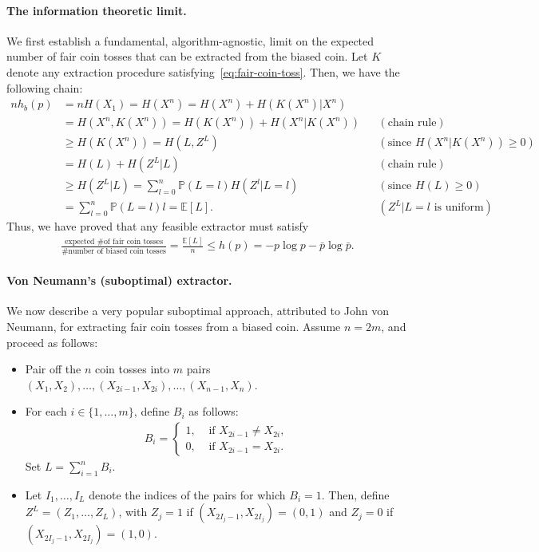 \documentclass[12pt]{article}
\begin{document}
\paragraph{The information theoretic limit.} We first establish a fundamental, algorithm-agnostic, limit on the expected number of fair coin tosses that can be extracted from the biased coin. Let $K$ denote any extraction procedure satisfying~\eqref{eq:fair-coin-toss}. Then, we have the following chain: 
\begin{align}
n h_b(p) &= n H(X_1) = H(X^n) = H(X^n) + H(K(X^n)|X^n)  \\
& = H(X^n, K(X^n)) = H(K(X^n)) + H(X^n|K(X^n)) && (\text{chain rule}) \\
& \geq H(K(X^n)) = H(L, Z^L) && (\text{since } H(X^n|K(X^n)) \geq 0) \\
& =  H(L) + H(Z^L|L) && (\text{chain rule}) \\
& \geq H(Z^L|L) = \sum_{l=0}^{n} \mathbb{P}(L=l) H(Z^l|L=l) && (\text{since } H(L) \geq 0) \\
& = \sum_{l=0}^{n} \mathbb{P}(L=l) l = \mathbb{E}[L]. && (Z^L|L=l \text{ is uniform}) 
\end{align}
Thus, we have proved that any feasible extractor must satisfy 
\begin{align}
\frac{\text{expected \# of fair coin tosses}}{\text{\# number of biased coin tosses}} = \frac{\mathbb{E}[L]}{n}  \leq h(p)= -p \log p - \bar{p} \log \bar{p}.  \label{eq:fundamental-limit}
\end{align}

\paragraph{Von Neumann's (suboptimal) extractor.} We now describe a very popular suboptimal approach, attributed to John von Neumann, for extracting fair coin tosses from a biased coin. Assume $n = 2m$, and proceed as follows: 
\begin{itemize}
\item Pair off the $n$ coin tosses into $m$ pairs $(X_1, X_2), \ldots, (X_{2i-1}, X_{2i}), \ldots, (X_{n-1}, X_n)$. 
\item For each $i \in \{1, \ldots, m\}$, define $B_i$ as follows: 
\begin{align}
B_i = \begin{cases}
1, & \text{ if } X_{2i-1} \neq X_{2i}, \\
0, & \text{ if } X_{2i-1} = X_{2i}. 
\end{cases}
\end{align}
Set $L = \sum_{i=1}^n B_i$. 
\item Let $I_1, \ldots, I_L$ denote the indices of the pairs for which $B_i=1$. Then, define $Z^L = (Z_1, \ldots, Z_L)$, with $Z_j=1$ if $(X_{2I_j-1}, X_{2I_j}) = (0, 1)$ and $Z_j=0$ if $(X_{2I_j-1}, X_{2I_j}) = (1, 0)$. 
\end{itemize}
\end{document}
